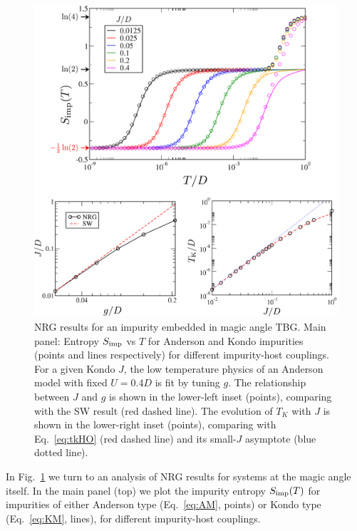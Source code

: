 \begin{figure}[t]
	\centering
	\includegraphics[width = \linewidth]{figures/chapter2/kondo2.pdf}
	\caption{
		\small NRG results for an impurity embedded in magic angle TBG. Main panel: Entropy $S_{\rm imp}$ vs $T$ for Anderson and Kondo impurities (points and lines respectively)  for different impurity-host couplings. For a given Kondo $J$, the low temperature physics of an Anderson model with fixed $U=0.4D$ is fit by tuning $g$. The relationship between $J$ and $g$ is shown in the lower-left inset (points), comparing with the SW result (red dashed line). The evolution of $T_K$ with $J$ is shown in the lower-right inset (points), comparing with Eq.~\ref{eq:tkHO} (red dashed line) and its small-$J$ asymptote (blue dotted line). }
	\label{fig:kondomagic}
\end{figure}

In Fig.~\ref{fig:kondomagic} we turn to an analysis of NRG results for systems at the magic angle itself. In the main panel (top) we plot the impurity entropy $S_{\rm imp}(T)$ for impurities of either Anderson type (Eq.~\ref{eq:AM}, points) or Kondo type (Eq.~\ref{eq:KM}, lines), for different impurity-host couplings. 

